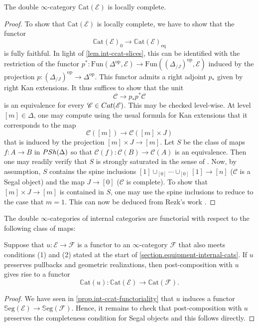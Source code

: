 \documentclass[a4paper, 11pt]{amsart}
\numberwithin{theorem}{section}
\theoremstyle{definition}
\newcommand{\cat}[1]{\textup{#1}}
\newcommand{\op}{\mathrm{op}}
\newcommand{\fun}{\mathrm{Fun}}
\newcommand{\Cat}{\cat{Cat}}
\newcommand{\C}{\mathscr{C}}
\newcommand{\E}{\mathscr{E}}
\newcommand{\F}{\mathscr{F}}
\newcommand{\PSh}{\cat{PSh}}
\newcommand{\SSEG}{\mathbb{S}\mathrm{eg}}
\newcommand{\CCAT}{\mathbb{C}\mathrm{at}}
\begin{document}
\begin{proposition}\label{prop.int-ccat-loc-comp}
	The double $\infty$-category $\CCAT(\E)$ is locally complete.
\end{proposition}
\begin{proof}
	To show that $\CCAT(\E)$ is locally complete, we have to show that the functor 
	$$
	\CCAT(\E)_0 \rightarrow \CCAT(\E)_\mathrm{eq}
	$$
	is fully faithful. In light of \cref{lem.int-ccat-slices}, this can be identified with the restriction of the functor 
	$
	p^* : \fun(\Delta^\op,\E) \rightarrow \fun((\Delta_{/J})^\op, \E)
	$
	induced by the projection $p : (\Delta_{/J})^\op \rightarrow \Delta^\op$. This functor admits a right adjoint $p_*$ given by right Kan extensions. It thus suffices to show that the unit 
	$$
	\C \rightarrow p_*p^*\C 
	$$
	is an equivalence for every $\C \in \Cat(\E)$. This may be checked level-wise. At level $[m] \in \Delta$, one may compute using the usual 
	formula for Kan extensions that it corresponds to the map
	$$
	\C([m]) \rightarrow \C([m] \times J)
	$$
	that is induced by the projection $[m] \times J \rightarrow [m]$. Let $S$ be the class of maps $f : A \rightarrow B$ in $\PSh(\Delta)$ so that $\C(f) : \C(B) \rightarrow \C(A)$ is an equivalence. Then one 
	may readily verify that $S$ is strongly saturated in the sense of \cite[Definition 5.5.4.5]{HTT}. Now, by assumption, $S$ contains the spine inclusions 
	$[1] \cup_{[0]} \dotsb \cup_{[0]} [1] \rightarrow [n]$ ($\C$ is a Segal object) and the map $J \rightarrow [0]$ ($\C$ is complete). To show that $[m] \times J \rightarrow [m]$ is contained in $S$, one may use 
	the spine inclusions to reduce to the case that $m =1$. This can now be deduced from Rezk's work \cite[Proposition 12.1]{RezkSeg}.
\end{proof}


The double $\infty$-categories of internal categories are functorial with respect to the following class of maps:

\begin{proposition}\label{prop.int-ccat-topos-functoriality}
	Suppose that $u : \E \rightarrow \F$ is a functor to an $\infty$-category $\F$ that also meets conditions (1) and (2) stated at the start of \cref{section.equipment-internal-cats}. If 
	$u$ preserves pullbacks and geometric realizations, 
	then post-composition with $u$ 
	gives rise to a functor $$\CCAT(u) : \CCAT(\E) \rightarrow \CCAT(\F).$$
\end{proposition}
\begin{proof}
	We have seen in \cref{prop.int-ccat-functoriality} that $u$ induces a functor 
	$ \SSEG(\E) \rightarrow \SSEG(\F)$. Hence, it remains to check that post-composition with $u$ preserves the completeness condition for Segal objects and this follows directly.
\end{proof}
\end{document}
